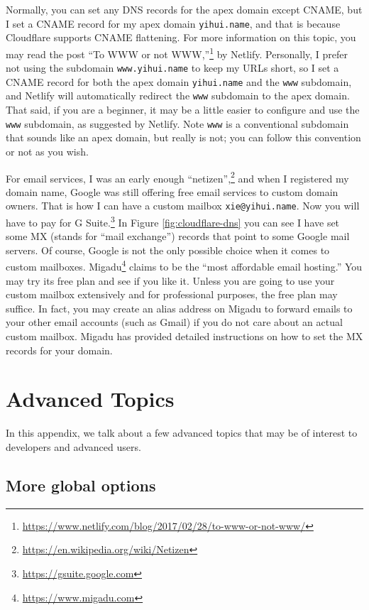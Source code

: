 \documentclass[12pt,]{krantz}
\renewcommand{\href}[2]{#2\footnote{\url{#1}}}
\theoremstyle{definition}
\theoremstyle{definition}
\theoremstyle{definition}
\theoremstyle{remark}
\begin{document}
Normally, you can set any DNS records for the apex domain except CNAME,
but I set a CNAME record for my apex domain \texttt{yihui.name}, and
that is because Cloudflare supports CNAME flattening. For more
information on this topic, you may read the post
\href{https://www.netlify.com/blog/2017/02/28/to-www-or-not-www/}{``To
WWW or not WWW,''} by Netlify. Personally, I prefer not using the
subdomain \texttt{www.yihui.name} to keep my URLs short, so I set a
CNAME record for both the apex domain \texttt{yihui.name} and the
\texttt{www} subdomain, and Netlify will automatically redirect the
\texttt{www} subdomain to the apex domain. That said, if you are a
beginner, it may be a little easier to configure and use the
\texttt{www} subdomain, as suggested by Netlify. Note \texttt{www} is a
conventional subdomain that sounds like an apex domain, but really is
not; you can follow this convention or not as you wish.

For email services, I was an early enough
\href{https://en.wikipedia.org/wiki/Netizen}{``netizen'',} and when I
registered my domain name, Google was still offering free email services
to custom domain owners. That is how I can have a custom mailbox
\texttt{xie@yihui.name}. Now you will have to pay for
\href{https://gsuite.google.com}{G Suite.} In Figure
\ref{fig:cloudflare-dns} you can see I have set some MX (stands for
``mail exchange'') records that point to some Google mail servers. Of
course, Google is not the only possible choice when it comes to custom
mailboxes. \href{https://www.migadu.com}{Migadu} claims to be the ``most
affordable email hosting.'' You may try its free plan and see if you
like it. Unless you are going to use your custom mailbox extensively and
for professional purposes, the free plan may suffice. In fact, you may
create an alias address on Migadu to forward emails to your other email
accounts (such as Gmail) if you do not care about an actual custom
mailbox. Migadu has provided detailed instructions on how to set the MX
records for your domain.

\hypertarget{advanced-topics}{%
\chapter{Advanced Topics}\label{advanced-topics}}

In this appendix, we talk about a few advanced topics that may be of
interest to developers and advanced users.

\hypertarget{more-global-options}{%
\section{More global options}\label{more-global-options}}
\end{document}
